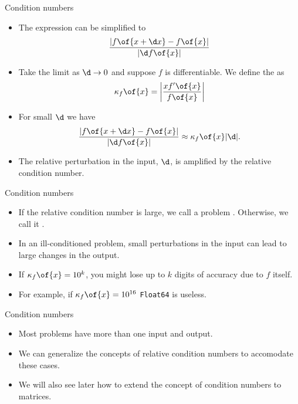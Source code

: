\documentclass[11pt,xcolor={dvipsnames},aspectratio=159,hyperref={pdftex,pdfpagemode=UseNone,hidelinks,pdfdisplaydoctitle=true},usepdftitle=false]{beamer}
\begin{document}
\begin{frame}{Condition numbers}
    \begin{itemize}
     \item The expression can be simplified to \begin{align*}
     \frac{|f\of{x+\d x}-f\of{x}|}{|\d f\of{x}|}
     \end{align*}
    \item Take the limit as $\d \rightarrow 0$ and suppose $f$ is differentiable. We define 
    the  as 
    \begin{align*}
        \kappa_f\of{x} = \bigg| \frac{ x f^\prime\of{x}}{f\of{x}} \bigg|
    \end{align*}
    \vspace{-1.25cm}
    \item For small $\d$ we have \begin{align*}
    \frac{|f\of{x+\d x}-f\of{x}|}{|\d f\of{x}|} \approx \kappa_f\of{x} |\d|.
    \end{align*}
     \item The relative perturbation in the input, $\d$, is amplified by the relative condition number.
    \end{itemize}
\end{frame}

\begin{frame}{Condition numbers}
    \begin{itemize}
     \item If the relative condition number is large, we call a problem . Otherwise, we call it .
     \item In an ill-conditioned problem, small perturbations in the input can lead to large changes in the output. 
     \item If $\kappa_f\of{x} = 10^k$, you might lose up to $k$ digits of accuracy due to $f$ itself. 
     \item For example, if $\kappa_f\of{x} = 10^{16}$ \texttt{Float64} is useless. 
    \end{itemize}
\end{frame}


\begin{frame}{Condition numbers}
    \begin{itemize}
     \item Most problems have more than one input and output. 
     \item We can generalize the concepts of relative condition numbers to accomodate these cases. 
     \item We will also see later how to extend the concept of condition numbers to matrices.
    \end{itemize}
\end{frame}
\end{document}
